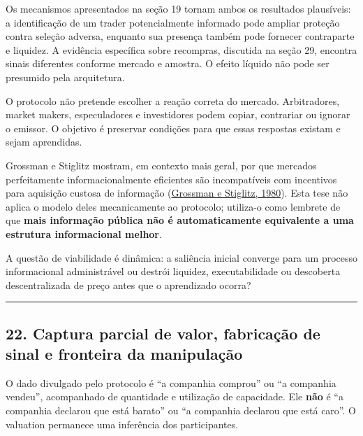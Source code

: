 \documentclass[
  a4paper,
]{article}
\begin{document}
Os mecanismos apresentados na seção 19 tornam ambos os resultados
plausíveis: a identificação de um trader potencialmente informado pode
ampliar proteção contra seleção adversa, enquanto sua presença também
pode fornecer contraparte e liquidez. A evidência específica sobre
recompras, discutida na seção 29, encontra sinais diferentes conforme
mercado e amostra. O efeito líquido não pode ser presumido pela
arquitetura.

O protocolo não pretende escolher a reação correta do mercado.
Arbitradores, market makers, especuladores e investidores podem copiar,
contrariar ou ignorar o emissor. O objetivo é preservar condições para
que essas respostas existam e sejam aprendidas.

Grossman e Stiglitz mostram, em contexto mais geral, por que mercados
perfeitamente informacionalmente eficientes são incompatíveis com
incentivos para aquisição custosa de informação
(\protect\hyperlink{ref-6}{Grossman e Stiglitz, 1980}). Esta tese não
aplica o modelo deles mecanicamente ao protocolo; utiliza-o como
lembrete de que \textbf{mais informação pública não é automaticamente
equivalente a uma estrutura informacional melhor}.

A questão de viabilidade é dinâmica: a saliência inicial converge para
um processo informacional administrável ou destrói liquidez,
executabilidade ou descoberta descentralizada de preço antes que o
aprendizado ocorra?

\begin{center}\rule{0.5\linewidth}{0.5pt}\end{center}

\hypertarget{22-manipulacao-gross-e-transferencia-de-valor-a-terceiros}{}

\hypertarget{22-captura-parcial-de-valor-fabricauxe7uxe3o-de-sinal-e-fronteira-da-manipulauxe7uxe3o}{%
\subsection{22. Captura parcial de valor, fabricação de sinal e
fronteira da
manipulação}\label{22-captura-parcial-de-valor-fabricauxe7uxe3o-de-sinal-e-fronteira-da-manipulauxe7uxe3o}}

O dado divulgado pelo protocolo é ``a companhia comprou'' ou ``a
companhia vendeu'', acompanhado de quantidade e utilização de
capacidade. Ele \textbf{não} é ``a companhia declarou que está barato''
ou ``a companhia declarou que está caro''. O valuation permanece uma
inferência dos participantes.
\end{document}
